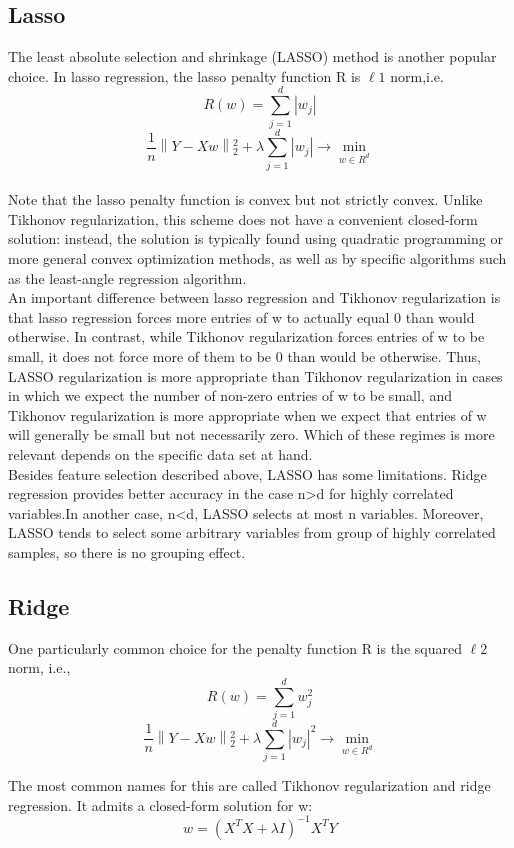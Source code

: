 \documentclass[conference]{IEEEtran}
\begin{document}
\subsection{Lasso}
The least absolute selection and shrinkage (LASSO) method is another popular choice. In lasso regression, the lasso penalty function R is $\ell1$ norm,i.e.
$$R(w) =  \sum_{j=1}^{d} \left | w_j \right | $$
$$\frac{1}{n} \left \| Y-Xw \right \| {^2_2} + {\lambda}\sum_{j=1}^{d} \left | w_j \right | \to\mathop{min}\limits_{w\in{R^d}}$$
~\\
Note that the lasso penalty function is convex but not strictly convex. Unlike Tikhonov regularization, this scheme does not have a convenient closed-form solution: instead, the solution is typically found using quadratic programming or more general convex optimization methods, as well as by specific algorithms such as the least-angle regression algorithm.
~\\
An important difference between lasso regression and Tikhonov regularization is that lasso regression forces more entries of w to actually equal 0 than would otherwise. In contrast, while Tikhonov regularization forces entries of w to be small, it does not force more of them to be 0 than would be otherwise. Thus, LASSO regularization is more appropriate than Tikhonov regularization in cases in which we expect the number of non-zero entries of w to be small, and Tikhonov regularization is more appropriate when we expect that entries of w will generally be small but not necessarily zero. Which of these regimes is more relevant depends on the specific data set at hand.
~\\
Besides feature selection described above, LASSO has some limitations. Ridge regression provides better accuracy in the case n>d for highly correlated variables.In another case, n<d, LASSO selects at most n variables. Moreover, LASSO tends to select some arbitrary variables from group of highly correlated samples, so there is no grouping effect.

\subsection{Ridge}
One particularly common choice for the penalty function R is the squared $\ell2$ norm, i.e.,
~\\
$$R(w)=\sum_{j=1}^{d} w{^2_j}$$
$$\frac{1}{n} \left \| Y-Xw \right \| {^2_2} + {\lambda}\sum_{j=1}^{d} {\left | w_j \right |}^2 \to\mathop{min}\limits_{w\in{R^d}}$$

The most common names for this are called Tikhonov regularization and ridge regression. It admits a closed-form solution for w:
$$w=(X^{T}X + \lambda I)^{-1} X^{T}Y$$
\end{document}
